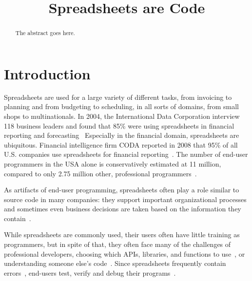 \documentclass[conference]{IEEEtran}
\begin{document}
\title{Spreadsheets are Code}

\author{
}


\maketitle

\begin{abstract}
The abstract goes here.
\end{abstract}

\IEEEpeerreviewmaketitle

\section{Introduction}
Spreadsheets are used for a large variety of different tasks, from invoicing to planning and from budgeting to scheduling, in all sorts of domains, from small shops to multinationals. In 2004, the International Data Corporation interview 118 business leaders and found that 85\% were using spreadsheets in financial reporting and forecasting~\cite{Panko2008} Especially in the financial domain, spreadsheets are ubiquitous. Financial intelligence firm CODA reported in 2008 that 95\% of all U.S. companies use spreadsheets for financial reporting~\cite{Panko2008}. The number of end-user programmers in the USA alone is conservatively estimated at 11 million, compared to only 2.75 million other, professional programmers~\cite{Scaf2005}. 




As artifacts of end-user programming, spreadsheets often play a role similar to source code in many companies: they support important organizational processes and sometimes even business decisions are taken based on the information they contain~\cite{Hermans2011}.

While spreadsheets are commonly used, their users often have little training as programmers, but in spite of that, they often face many of the challenges of professional developers, choosing which APIs, libraries, and functions to use~\cite{Ko2004}, or understanding someone else's code~\cite{Ko2011}. Since spreadsheets frequently contain errors~\cite{Panko1998}, end-users test, verify and debug their programs~\cite{Hermans2013-Cascon,Ko2004-Why}.
\end{document}
